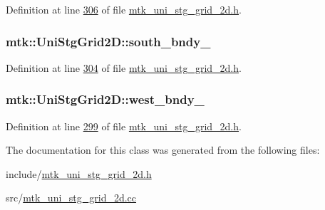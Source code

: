 Definition at line \hyperlink{mtk__uni__stg__grid__2d_8h_source_l00306}{306} of file \hyperlink{mtk__uni__stg__grid__2d_8h_source}{mtk\+\_\+uni\+\_\+stg\+\_\+grid\+\_\+2d.\+h}.

\hypertarget{classmtk_1_1UniStgGrid2D_ac228c81fad7f4feeae93fb3c09d7e175}{
\subsubsection[{south\+\_\+bndy\+\_\+}]{ mtk\+::\+Uni\+Stg\+Grid2\+D\+::south\+\_\+bndy\+\_\+\hspace{0.3cm}{\ttfamily [private]}}}\label{classmtk_1_1UniStgGrid2D_ac228c81fad7f4feeae93fb3c09d7e175}


Definition at line \hyperlink{mtk__uni__stg__grid__2d_8h_source_l00304}{304} of file \hyperlink{mtk__uni__stg__grid__2d_8h_source}{mtk\+\_\+uni\+\_\+stg\+\_\+grid\+\_\+2d.\+h}.

\hypertarget{classmtk_1_1UniStgGrid2D_a59c42d8099a017bc8a082fddc1e5606c}{
\subsubsection[{west\+\_\+bndy\+\_\+}]{ mtk\+::\+Uni\+Stg\+Grid2\+D\+::west\+\_\+bndy\+\_\+\hspace{0.3cm}{\ttfamily [private]}}}\label{classmtk_1_1UniStgGrid2D_a59c42d8099a017bc8a082fddc1e5606c}


Definition at line \hyperlink{mtk__uni__stg__grid__2d_8h_source_l00299}{299} of file \hyperlink{mtk__uni__stg__grid__2d_8h_source}{mtk\+\_\+uni\+\_\+stg\+\_\+grid\+\_\+2d.\+h}.



The documentation for this class was generated from the following files\+:\begin{DoxyCompactItemize}
\item 
include/\hyperlink{mtk__uni__stg__grid__2d_8h}{mtk\+\_\+uni\+\_\+stg\+\_\+grid\+\_\+2d.\+h}\item 
src/\hyperlink{mtk__uni__stg__grid__2d_8cc}{mtk\+\_\+uni\+\_\+stg\+\_\+grid\+\_\+2d.\+cc}\end{DoxyCompactItemize}

